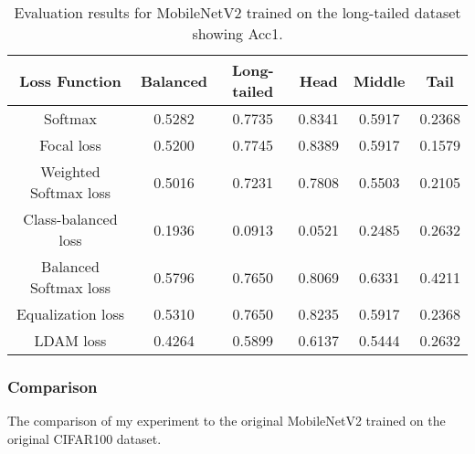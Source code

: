 \begin{table}[H]
    \centering
    \begin{tabular}{cccccc}
        \toprule
        Loss Function & Balanced & Long-tailed & Head & Middle & Tail \\ 
        \midrule
        Softmax   & 0.5282   & 0.7735 & 0.8341 & 0.5917 & 0.2368 \\
        Focal loss   & 0.5200   & 0.7745 & 0.8389 & 0.5917 & 0.1579 \\
        Weighted Softmax loss   & 0.5016   & 0.7231 & 0.7808 & 0.5503 & 0.2105 \\
        Class-balanced loss   & 0.1936   & 0.0913 & 0.0521 & 0.2485 & 0.2632 \\
        Balanced Softmax loss   & 0.5796   & 0.7650 & 0.8069 & 0.6331 & 0.4211 \\
        Equalization loss   & 0.5310   & 0.7650 & 0.8235 & 0.5917 & 0.2368 \\
        LDAM loss   & 0.4264 & 0.5899 & 0.6137 & 0.5444 & 0.2632 \\
        \bottomrule
    \end{tabular}
    \caption{Evaluation results for MobileNetV2 trained on the long-tailed dataset showing Acc1.}
    \label{tab:mobilenet_lt_acc1_1}
\end{table}

\subsubsection{Comparison}

The comparison of my experiment to the original MobileNetV2 trained on the original CIFAR100 dataset.

